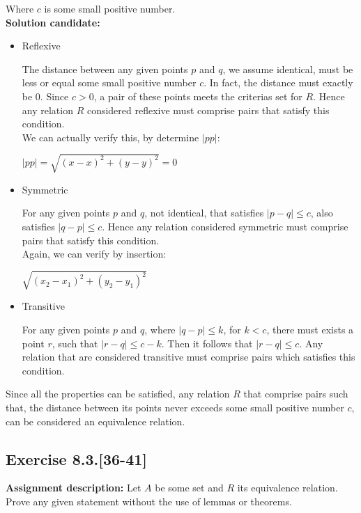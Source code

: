 \documentclass{report}
\newcommand{\cent}[1]{\begin{center}#1\end{center}}
\newcommand{\assignmentDescription}{\textbf{Assignment description: }}
\newcommand{\solution}{\textbf{Solution candidate: }}
\newcommand{\QED}{\boxed{}}
\newcommand{\Exercise}[1]{\subsection{Exercise #1}}
\begin{document}
	Where $c$ is some small positive number.\\
	
	\solution
	
	\begin{itemize}
		\item Reflexive
		
		The distance between any given points $p$ and $q$, we assume identical, must be less or equal some small positive number $c$. In fact, the distance must exactly be 0. Since $c > 0$, a pair of these points meets the criterias set for $R$. Hence any relation $R$ considered reflexive must comprise pairs that satisfy this condition.\\
		
		We can actually verify this, by determine $|pp|$:
		
		\cent{$ |pp| = \sqrt{(x - x)^2 + (y - y)^2} = 0 $}
		
		\item Symmetric
		
		For any given points $p$ and $q$, not identical, that satisfies $|p-q| \leq c$, also satisfies $|q-p| \leq c$. Hence any relation considered symmetric must comprise pairs that satisfy this condition.\\
		
		Again, we can verify by insertion:
		
		\cent{$\sqrt{(x_2 - x_1)^2 + (y_2 - y_1)^2}$}
		
		\item Transitive
		
		For any given points $p$ and $q$, where $|q-p| \leq k$, for $k < c$, there must exists a point $r$, such that $|r-q| \leq c - k$. Then it follows that $|r-q| \leq c$. Any relation that are considered transitive must comprise pairs which satisfies this condition.\\
	\end{itemize}
	
	Since all the properties can be satisfied, any relation $R$ that comprise pairs such that, the distance between its points never exceeds some small positive number $c$, can be considered an equivalence relation.\\
	\QED
	
	\Exercise{8.3.[36-41]}
	
	\assignmentDescription
	Let $A$ be some set and $R$ its equivalence relation.\\
	
	Prove any given statement without the use of lemmas or theorems.\\
	
\end{document}
